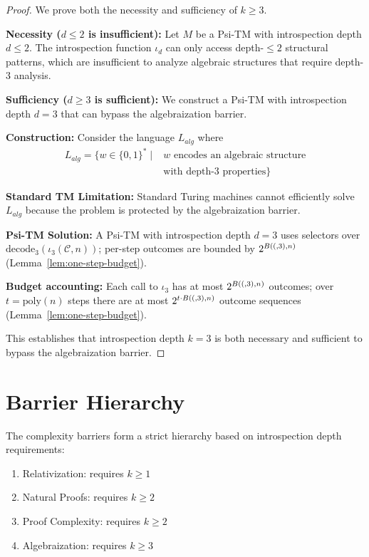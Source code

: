 \begin{proof}
We prove both the necessity and sufficiency of $k \geq 3$.

\textbf{Necessity ($d \le 2$ is insufficient):}
Let $M$ be a Psi-TM with introspection depth $d \leq 2$. The introspection function $\iota_d$ can only access depth-$\leq 2$ structural patterns, which are insufficient to analyze algebraic structures that require depth-3 analysis.

\textbf{Sufficiency ($d \ge 3$ is sufficient):}
We construct a Psi-TM with introspection depth $d = 3$ that can bypass the algebraization barrier.

\textbf{Construction:}
Consider the language $L_{alg}$ where
\begin{align}
L_{alg} = \{w \in \{0,1\}^* \mid &\text{$w$ encodes an algebraic structure} \nonumber \\
&\text{with depth-3 properties}\}
\end{align}

\textbf{Standard TM Limitation:}
Standard Turing machines cannot efficiently solve $L_{alg}$ because the problem is protected by the algebraization barrier.

\textbf{Psi-TM Solution:}
A Psi-TM with introspection depth $d = 3$ uses selectors over $\mathrm{decode}_3(\iota_3(\mathcal{C},n))$; per-step outcomes are bounded by $2^{B((,3),n)}$ (Lemma~\ref{lem:one-step-budget}).

\textbf{Budget accounting:}
Each call to $\iota_3$ has at most $2^{B((,3),n)}$ outcomes; over $t=\mathrm{poly}(n)$ steps there are at most $2^{t\cdot B((,3),n)}$ outcome sequences (Lemma~\ref{lem:one-step-budget}).

This establishes that introspection depth $k = 3$ is both necessary and sufficient to bypass the algebraization barrier.
\end{proof}

\section{Barrier Hierarchy}

\begin{theorem}
The complexity barriers form a strict hierarchy based on introspection depth requirements:
\begin{enumerate}
\item Relativization: requires $k \geq 1$
\item Natural Proofs: requires $k \geq 2$
\item Proof Complexity: requires $k \geq 2$
\item Algebraization: requires $k \geq 3$
\end{enumerate}
\end{theorem}

